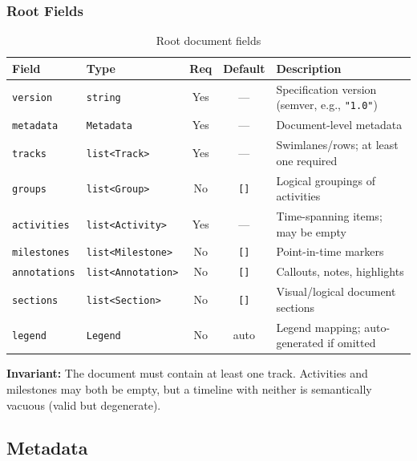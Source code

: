 \subsubsection{Root Fields}

\begin{table}[h]
\centering
\small
\begin{tabular}{llccp{5cm}}
\toprule
\textbf{Field} & \textbf{Type} & \textbf{Req} & \textbf{Default} & \textbf{Description} \\
\midrule
\texttt{version} & \texttt{string} & Yes & --- & Specification version (semver, e.g., \texttt{"1.0"}) \\
\texttt{metadata} & \texttt{Metadata} & Yes & --- & Document-level metadata \\
\texttt{tracks} & \texttt{list<Track>} & Yes & --- & Swimlanes/rows; at least one required \\
\texttt{groups} & \texttt{list<Group>} & No & \texttt{[]} & Logical groupings of activities \\
\texttt{activities} & \texttt{list<Activity>} & Yes & --- & Time-spanning items; may be empty \\
\texttt{milestones} & \texttt{list<Milestone>} & No & \texttt{[]} & Point-in-time markers \\
\texttt{annotations} & \texttt{list<Annotation>} & No & \texttt{[]} & Callouts, notes, highlights \\
\texttt{sections} & \texttt{list<Section>} & No & \texttt{[]} & Visual/logical document sections \\
\texttt{legend} & \texttt{Legend} & No & auto & Legend mapping; auto-generated if omitted \\
\bottomrule
\end{tabular}
\caption{Root document fields}
\label{tab:root-fields}
\end{table}

\textbf{Invariant:} The document must contain at least one track. Activities and milestones
may both be empty, but a timeline with neither is semantically vacuous (valid but degenerate).


\subsection{Metadata}
\label{sec:ir-metadata}

